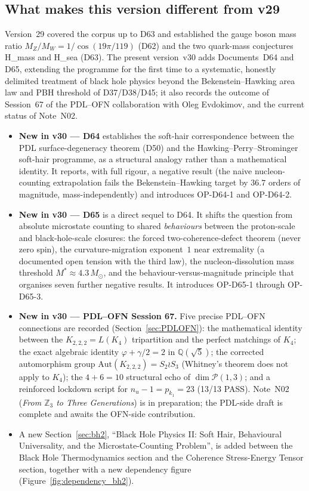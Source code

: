 \documentclass[11pt,a4paper]{article}
\theoremstyle{plain}
\theoremstyle{definition}
\theoremstyle{remark}
\begin{document}
\subsection{What makes this version different from v29}
\label{subsec:diffv29}
Version~29 covered the corpus up to D63 and established the gauge boson mass ratio $M_Z/M_W = 1/\cos(19\pi/119)$ (D62) and the two quark-mass conjectures H\_mass and H\_sea (D63). The present version~v30 adds Documents~D64 and D65, extending the programme for the first time to a systematic, honestly delimited treatment of black hole physics beyond the Bekenstein--Hawking area law and PBH threshold of D37/D38/D45; it also records the outcome of Session~67 of the PDL--OFN collaboration with Oleg Evdokimov, and the current status of Note~N02.

\begin{itemize}
\item \textbf{New in v30 --- D64} establishes the soft-hair correspondence between the PDL surface-degeneracy theorem (D50) and the Hawking--Perry--Strominger soft-hair programme, as a structural analogy rather than a mathematical identity. It reports, with full rigour, a negative result (the naive nucleon-counting extrapolation fails the Bekenstein--Hawking target by $36.7$ orders of magnitude, mass-independently) and introduces OP-D64-1 and OP-D64-2.
\item \textbf{New in v30 --- D65} is a direct sequel to D64. It shifts the question from absolute microstate counting to shared \emph{behaviours} between the proton-scale and black-hole-scale closures: the forced two-coherence-defect theorem (never zero spin), the curvature-migration exponent~$1$ near extremality (a documented open tension with the third law), the nucleon-dissolution mass threshold $M^*\approx4.3\,M_\odot$, and the behaviour-versus-magnitude principle that organises seven further negative results. It introduces OP-D65-1 through OP-D65-3.
\item \textbf{New in v30 --- PDL--OFN Session 67.} Five precise PDL--OFN connections are recorded (Section~\ref{sec:PDLOFN}): the mathematical identity between the $K_{2,2,2}=L(K_4)$ tripartition and the perfect matchings of $K_4$; the exact algebraic identity $\varphi+\gamma/2=2$ in $\mathbb{Q}(\sqrt{5})$; the corrected automorphism group $\mathrm{Aut}(K_{2,2,2})=S_2\wr S_3$ (Whitney's theorem does not apply to $K_4$); the $4+6=10$ structural echo of $\dim\mathcal{P}(1,3)$; and a reinforced lockdown script for $n_u-1=p_{k_1}=23$ (13/13 PASS). Note~N02 (\emph{From $\mathbb{Z}_3$ to Three Generations}) is in preparation; the PDL-side draft is complete and awaits the OFN-side contribution.
\item A new Section~\ref{sec:bh2}, ``Black Hole Physics II: Soft Hair, Behavioural Universality, and the Microstate-Counting Problem'', is added between the Black Hole Thermodynamics section and the Coherence Stress-Energy Tensor section, together with a new dependency figure (Figure~\ref{fig:dependency_bh2}).
\end{itemize}
\end{document}
